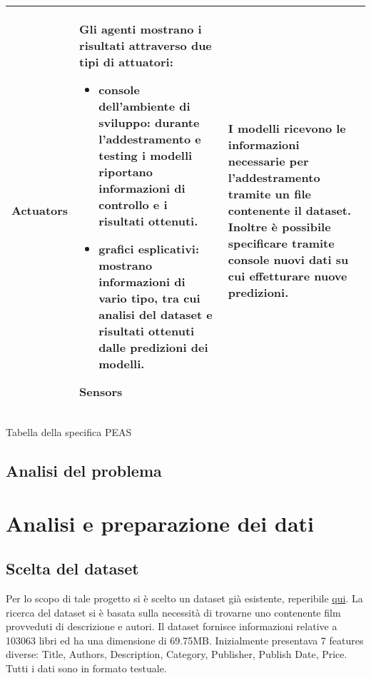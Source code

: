 \documentclass[12pt,oneside]{article}
\begin{document}
\begin{enumerate}
\begin{longtable}{ | p{3cm} | p{11cm} | }
\begin{itemize}
    \end{itemize}
    \hline
    \textbf{Actuators} & Gli agenti mostrano i risultati attraverso due tipi di attuatori: \begin{itemize}
    \item console dell'ambiente di sviluppo: durante l'addestramento e testing i modelli riportano informazioni di controllo e i risultati ottenuti.
    \item grafici esplicativi: mostrano informazioni di vario tipo, tra cui analisi del dataset e risultati ottenuti dalle predizioni dei modelli.\end{itemize}
    \hline
    \textbf{Sensors} & I modelli ricevono le informazioni necessarie per l'addestramento tramite un file contenente il dataset. Inoltre è possibile specificare tramite console nuovi dati su cui effetturare nuove predizioni. \\
    \hline
    
    \end{longtable}
   \caption{Tabella della specifica PEAS}
\label{table:ta}
\end{enumerate}

    \begin{enumerate}
    \subsection{Analisi del problema}
    \begin{justify}
    
    \end{justify}
    \end{enumerate}

\section{Analisi e preparazione dei dati}
    \begin{enumerate}
    \subsection{Scelta del dataset}
    \begin{justify}
    Per lo scopo di tale progetto si è scelto un dataset già esistente, reperibile \href{https://www.kaggle.com/datasets/elvinrustam/books-dataset}{qui}. La ricerca del dataset si è basata sulla necessità di trovarne uno contenente film provveduti di descrizione e autori. Il dataset fornisce informazioni relative a 103063 libri ed ha una dimensione di 69.75MB. Inizialmente presentava 7 features diverse: Title, Authors, Description, Category, Publisher, Publish Date, Price. Tutti i dati sono in formato testuale.
    \end{justify}
    \end{enumerate}
\end{document}
